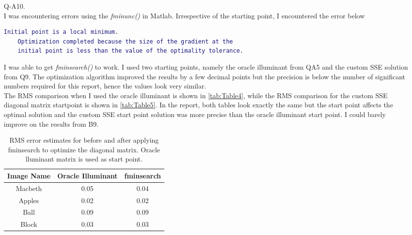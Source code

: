 \documentclass[12pt]{report}
\begin{document}
\begin{enumerate}
    \item[Q-A10.]
    \ \\
    I was encountering errors using the \emph{fminunc()} in Matlab. Irrespective of the starting point, I encountered the error below
    \begin{lstlisting}[language=Matlab]
    Initial point is a local minimum.
    Optimization completed because the size of the gradient at the 
    initial point is less than the value of the optimality tolerance.
    \end{lstlisting}
    I was able to get \emph{fminsearch()} to work. I used two starting points, namely the oracle illuminant from QA5 and the custom SSE solution from Q9. The optimization 
    algorithm improved the results by a few decimal points but the precision is below the number of significant numbers required for this report, hence the values look 
    very similar. \\
    The RMS comparison when I used the oracle illuminant is shown in \autoref{tab:Table4}, while the RMS comparison for the custom SSE diagonal matrix startpoint is shown 
    in \autoref{tab:Table5}. In the report, both tables look exactly the same but the start point affects the optimal solution and the custom SSE start point solution was 
    more precise than the oracle illuminant start point. I could barely improve on the results from B9.

    \begin{table}[h!]
    \begin{center}
    \begin{tabular}{ | c | c | c | } 
        \hline
        Image Name & Oracle Illuminant & fminsearch \\ 
        \hline \hline
        Macbeth & 0.05 & 0.04 \\ 
        Apples & 0.02 & 0.02 \\ 
        Ball & 0.09 & 0.09 \\ 
        Block & 0.03 & 0.03 \\ 
        \hline
    \end{tabular}
    \caption{RMS error estimates for before and after applying fminsearch to optimize the diagonal matrix. Oracle lluminant matrix is used as start point.}
    \label{tab:Table4}
    \end{center}
    \end{table}


\end{enumerate}
\end{document}
